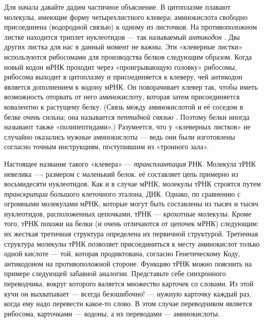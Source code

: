 \documentclass[../main.tex]{subfiles}
\begin{document}
Для начала давайте дадим частичное объяснение. В цитоплазме плавают молекулы, имеющие форму четырехлистного клевера; аминокислота свободно присоединена (водородной связью) к одному из листочков. На противоположном листке находится триплет нуклеотидов --- так называемый \emph{антикодон} . Два других листка для нас в данный момент не важны. Эти «клеверные листки» используются рибосомами для производства белков следующим образом. Когда новый кодон мРНК проходит через «проигрывающую головку» рибосомы, рибосома выходит в цитоплазму и присоединяется к клеверу, чей антикодон является дополнением к кодону мРНК. Он поворачивает клевер так, чтобы иметь возможность оторвать от него аминокислоту, которая затем присоединяется ковалентно к растущему белку. (Связь между аминокислотой и её соседом в белке очень сильна; она называется \emph{пептидной связью} . Поэтому белки иногда называют также «полипептидами».) Разумеется, что у «клеверных листков» не случайно оказались нужные аминокислоты --- ведь они были изготовлены согласно точным инструкциям, поступившим из «тронного зала».

Настоящее название такого «клевера» --- \emph{трансплантация} РНК. Молекула тРНК невелика ---- размером с маленький белок. её составляет цепь примерно из восьмидесяти нуклеотидов. Как и в случае мРНК, молекулы тРНК строятся путем \emph{транскрипции} большого клеточного эталона, ДНК. Однако, по сравнению с огромными молекулами мРНК, которые могут быть составлены из тысяч и тысяч нуклеотидов, расположенных цепочками, тРНК --- крохотные молекулы. Кроме того, тРНК похожи на белки (и очень отличаются от цепочек мРНК) следующим: их жесткая третичная структура определена их первичной структурой. Третичная структура молекулы тРНК позволяет присоединиться к месту аминокислот только одной кислоте --- той, которая продиктована, согласно Генетическому Коду, антикодоном на противоположной стороне. Функцию тРНК можно пояснить на примере следующей забавной аналогии. Представьте себе синхронного переводчика, вокруг которого валяется множество карточек со словами. Из этой кучи он выхватывает --- всегда безошибочно! --- нужную карточку каждый раз, когда ему надо перевести какое-то слово. В этом случае переводчиком является рибосома, карточками --- кодоны, а их переводами --- аминокислоты.
\end{document}
